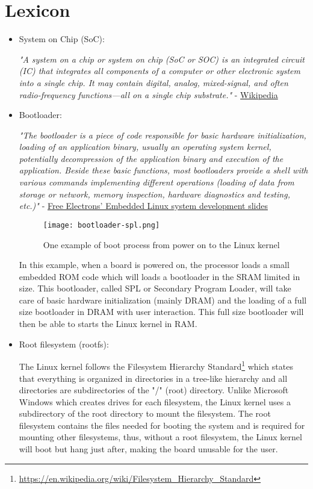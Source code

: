 \chapter*{Lexicon}

\begin{itemize}
\item System on Chip (SoC):

\textit{"A system on a chip or system on chip (SoC or SOC) is an integrated circuit (IC) that integrates all components of a computer or other electronic system into a single chip. It may contain digital, analog, mixed-signal, and often radio-frequency functions—all on a single chip substrate."} - \href{https://en.wikipedia.org/wiki/System\_on\_a\_chip}{Wikipedia}

\item Bootloader:

\textit{"The bootloader is a piece of code responsible for basic hardware initialization, loading of an application binary, usually an operating system kernel, potentially decompression of the application binary and execution of the application. Beside these basic functions, most bootloaders provide a shell with various commands implementing different operations (loading of data from storage or network, memory inspection, hardware diagnostics and testing, etc.)"} - \href{http://free-electrons.com/doc/training/embedded-linux/embedded-linux-slides.pdf}{Free Electrons' Embedded Linux system development slides}

\begin{figure}[H]
  \centering
  \texttt{[image: bootloader-spl.png]}
  \caption{One example of boot process from power on to the Linux kernel}
\end{figure}

In this example, when a board is powered on, the processor loads a small embedded ROM code which will loads a bootloader in the SRAM limited in size. This bootloader, called SPL or Secondary Program Loader, will take care of basic hardware initialization (mainly DRAM) and the loading of a full size bootloader in DRAM with user interaction. This full size bootloader will then be able to starts the Linux kernel in RAM.

\item Root filesystem (rootfs):

The Linux kernel follows the Filesystem Hierarchy Standard\footnote{\url{https://en.wikipedia.org/wiki/Filesystem\_Hierarchy\_Standard}} which states that everything is organized in directories in a tree-like hierarchy and all directories are subdirectories of the "/" (root) directory. Unlike Microsoft Windows which creates drives for each filesystem, the Linux kernel uses a subdirectory of the root directory to mount the filesystem. The root filesystem contains the files needed for booting the system and is required for mounting other filesystems, thus, without a root filesystem, the Linux kernel will boot but hang just after, making the board unusable for the user.


\end{itemize}
